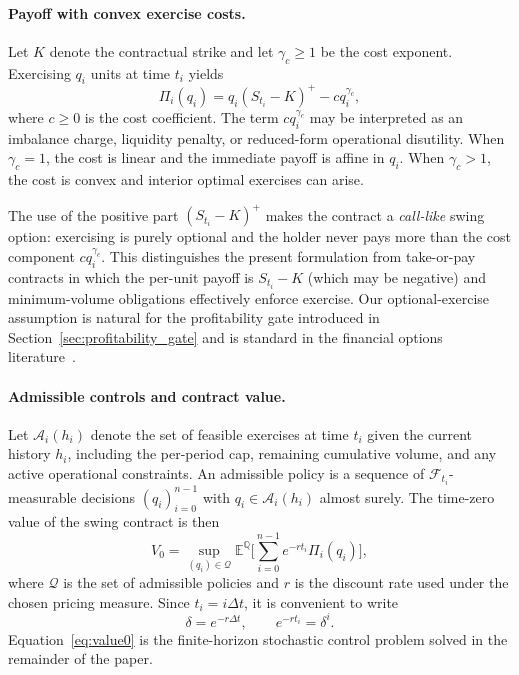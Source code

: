 \documentclass[a4paper,fleqn]{cas-dc}
\begin{document}
\paragraph{Payoff with convex exercise costs.}
Let $K$ denote the contractual strike and let $\gamma_c \ge 1$ be the cost exponent. Exercising $q_i$ units at time $t_i$ yields
\begin{equation}
\label{eq:payoff}
\Pi_i(q_i) = q_i (S_{t_i} - K)^+ - c q_i^{\gamma_c},
\end{equation}
where $c \ge 0$ is the cost coefficient. The term $c q_i^{\gamma_c}$ may be interpreted as an imbalance charge, liquidity penalty, or reduced-form operational disutility. When $\gamma_c = 1$, the cost is linear and the immediate payoff is affine in $q_i$. When $\gamma_c > 1$, the cost is convex and interior optimal exercises can arise.

The use of the positive part $(S_{t_i} - K)^+$ makes the contract a \emph{call-like} swing option: exercising is purely optional and the holder never pays more than the cost component $c q_i^{\gamma_c}$. This distinguishes the present formulation from take-or-pay contracts in which the per-unit payoff is $S_{t_i} - K$ (which may be negative) and minimum-volume obligations effectively enforce exercise. Our optional-exercise assumption is natural for the profitability gate introduced in Section~\ref{sec:profitability_gate} and is standard in the financial options literature~\cite{jaillet2004valuation,carmona2008swing}.

\paragraph{Admissible controls and contract value.}
Let $\mathcal{A}_i(h_i)$ denote the set of feasible exercises at time $t_i$ given the current history $h_i$, including the per-period cap, remaining cumulative volume, and any active operational constraints. An admissible policy is a sequence of $\mathcal{F}_{t_i}$-measurable decisions $(q_i)_{i=0}^{n-1}$ with $q_i \in \mathcal{A}_i(h_i)$ almost surely. The time-zero value of the swing contract is then
\begin{equation}
\label{eq:value0}
V_0 = \sup_{(q_i) \in \mathcal{Q}}
\mathbb{E}^{\mathbb{Q}}
\biggl[
\sum_{i=0}^{n-1} e^{-r t_i} \Pi_i(q_i)
\biggr],
\end{equation}
where $\mathcal{Q}$ is the set of admissible policies and $r$ is the discount rate used under the chosen pricing measure. Since $t_i = i \Delta t$, it is convenient to write
\[
\delta = e^{-r \Delta t},
\qquad
e^{-r t_i} = \delta^i.
\]
Equation~\eqref{eq:value0} is the finite-horizon stochastic control problem solved in the remainder of the paper.
\end{document}
